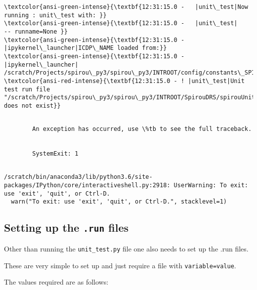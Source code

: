 \documentclass[11pt]{article}
\begin{document}
    \begin{Verbatim}[commandchars=\\\{\}]
\textcolor{ansi-green-intense}{\textbf{12:31:15.0 -   |unit\_test|Now running : unit\_test with: }}
\textcolor{ansi-green-intense}{\textbf{12:31:15.0 -   |unit\_test|       -- runname=None }}
\textcolor{ansi-green-intense}{\textbf{12:31:15.0 -   |ipykernel\_launcher|ICDP\_NAME loaded from:}}
\textcolor{ansi-green-intense}{\textbf{12:31:15.0 -   |ipykernel\_launcher|     /scratch/Projects/spirou\_py3/spirou\_py3/INTROOT/config/constants\_SPIROU\_H2RG.py}}
\textcolor{ansi-red-intense}{\textbf{12:31:15.0 - ! |unit\_test|Unit test run file "/scratch/Projects/spirou\_py3/spirou\_py3/INTROOT/SpirouDRS/spirouUnitTests/Runs/None" does not exist}}

    \end{Verbatim}

    \begin{Verbatim}[commandchars=\\\{\}]

        An exception has occurred, use \%tb to see the full traceback.


        SystemExit: 1


    \end{Verbatim}

    \begin{Verbatim}[commandchars=\\\{\}]
/scratch/bin/anaconda3/lib/python3.6/site-packages/IPython/core/interactiveshell.py:2918: UserWarning: To exit: use 'exit', 'quit', or Ctrl-D.
  warn("To exit: use 'exit', 'quit', or Ctrl-D.", stacklevel=1)

    \end{Verbatim}

    \subsection{\texorpdfstring{Setting up the \texttt{.run}
files}{Setting up the .run files}}\label{setting-up-the-.run-files}

Other than running the \texttt{unit\_test.py} file one also needs to set
up the .run files.

These are very simple to set up and just require a file with
\texttt{variable=value}.

The values required are as follows:
\end{document}
